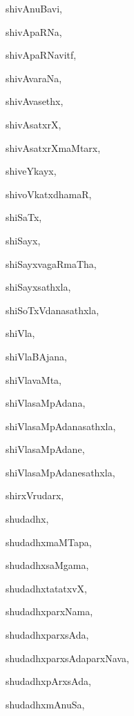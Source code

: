 \begin{multicols}{2}
{shivAnuBavi}, \pageref{shivAnuBavi}

{shivApaRNa}, \pageref{shivApaRNa}

{shivApaRNavitf}, \pageref{shivApaRNavitf}

{shivAvaraNa}, \pageref{shivAvaraNa}

{shivAvasethx}, \pageref{shivAvasethx}

{shivAsatxrX}, \pageref{shivAsatxrX}

{shivAsatxrXmaMtarx}, \pageref{shivAsatxrXmaMtarx}

{shiveYkayx}, \pageref{shiveYkayx}

{shivoVkatxdhamaR}, \pageref{shivoVkatxdhamaR}

{shiSaTx}, \pageref{shiSaTx}

{shiSayx}, \pageref{shiSayx}

{shiSayxvagaRmaTha}, \pageref{shiSayxvagaRmaTha}

{shiSayxsathxla}, \pageref{shiSayxsathxla}

{shiSoTxVdanasathxla}, \pageref{shiSoTxVdanasathxla}

{shiVla}, \pageref{shiVla}

{shiVlaBAjana}, \pageref{shiVlaBAjana}

{shiVlavaMta}, \pageref{shiVlavaMta}

{shiVlasaMpAdana}, \pageref{shiVlasaMpAdana}

{shiVlasaMpAdanasathxla}, \pageref{shiVlasaMpAdanasathxla}

{shiVlasaMpAdane}, \pageref{shiVlasaMpAdane}

{shiVlasaMpAdanesathxla}, \pageref{shiVlasaMpAdanesathxla}

{shirxVrudarx}, \pageref{shirxVrudarx}

{shudadhx}, \pageref{shudadhx}

{shudadhxmaMTapa}, \pageref{shudadhxmaMTapa}

{shudadhxsaMgama}, \pageref{shudadhxsaMgama}

{shudadhxtatatxvX}, \pageref{shudadhxtatatxvX}

{shudadhxparxNama}, \pageref{shudadhxparxNama}

{shudadhxparxsAda}, \pageref{shudadhxparxsAda}

{shudadhxparxsAdaparxNava}, \pageref{shudadhxparxsAdaparxNava}

{shudadhxpArxsAda}, \pageref{shudadhxpArxsAda}

{shudadhxmAnuSa}, \pageref{shudadhxmAnuSa}


\end{multicols}
